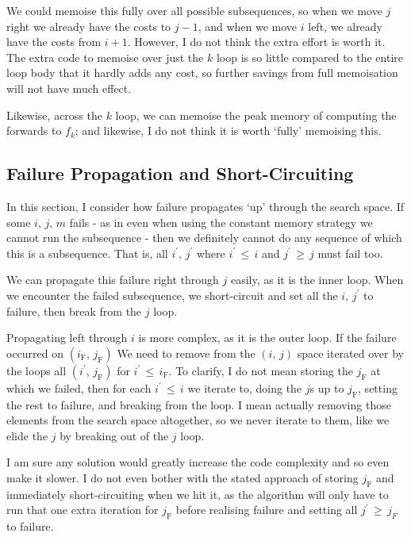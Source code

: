 We could memoise this fully over all possible subsequences, so when we move \(j\) right we already have the costs to \(j-1\), and when we move \(i\) left, we already have the costs from \(i+1\).
However, I do not think the extra effort is worth it.
The extra code to memoise over just the \(k\) loop is so little compared to the entire loop body that it hardly adds any cost, so further savings from full memoisation will not have much effect.

Likewise, across the \(k\) loop, we can memoise the peak memory of computing the forwards to \(f_k\); and likewise, I do not think it is worth `fully' memoising this.

\subsection{Failure Propagation and Short-Circuiting}
In this section, I consider how failure propagates `up' through the search space.
If some \(i,\,j,\,m\) fails - as in even when using the constant memory strategy we cannot run the subsequence - then we definitely cannot do any sequence of which this is a subsequence.
That is, all \(i^\prime,\, j^\prime\) where \(i^\prime \,\leq\, i\) and \(j^\prime \,\geq\, j\) must fail too.

We can propagate this failure right through \(j\) easily, as it is the inner loop.
When we encounter the failed subsequence, we short-circuit and set all the \(i,\, j^\prime\) to failure, then break from the \(j\) loop.

Propagating left through \(i\) is more complex, as it is the outer loop.
If the failure occurred on \((i_\mathrm{F},\, j_\mathrm{F})\) We need to remove from the \((i,\,j)\) space iterated over by the loops all \((i^\prime,\, j_{\mathrm{F}})\) for \(i^\prime \,\leq\, i_\mathrm{F}\).
To clarify, I do not mean storing the \(j_\mathrm{F}\) at which we failed, then for each \(i^\prime \,\leq\, i\) we iterate to, doing the \(j\)s up to \(j_\mathrm{F}\), setting the rest to failure, and breaking from the loop.
I mean actually removing those elements from the search space altogether, so we never iterate to them, like we elide the \(j\) by breaking out of the \(j\) loop.

I am sure any solution would greatly increase the code complexity and so even make it slower.
I do not even bother with the stated approach of storing \(j_\mathrm{F}\) and immediately short-circuiting when we hit it, as the algorithm will only have to run that one extra iteration for \(j_\mathrm{F}\) before realising failure and setting all \(j^\prime \,\geq\, j_{F}\) to failure.

